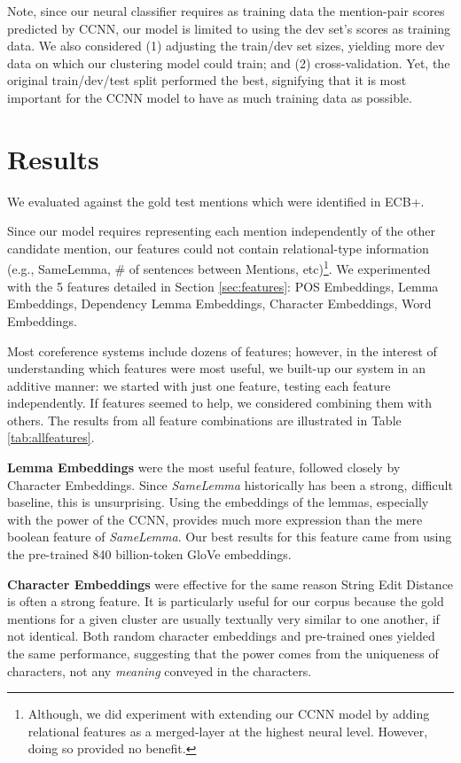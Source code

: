 \documentclass[11pt,a4paper]{article}
\begin{document}
Note, since our neural classifier requires as training data the mention-pair scores predicted by CCNN, our model is limited to using the dev set's scores as training data.  We also considered (1) adjusting the train/dev set sizes, yielding more dev data on which our clustering model could train; and (2) cross-validation.  Yet, the original train/dev/test split performed the best, signifying that it is most important for the CCNN model to have as much training data as possible.

\section{Results}
We evaluated against the gold test mentions which were identified in ECB+.

Since our model requires representing each mention independently of the other candidate mention, our features could not contain relational-type information (e.g., SameLemma, \# of sentences between Mentions, etc)\footnote{Although, we did experiment with extending our CCNN model by adding relational features as a merged-layer at the highest neural level.  However, doing so provided no benefit.}.  We experimented with the 5 features detailed in Section \ref{sec:features}: POS Embeddings, Lemma Embeddings, Dependency Lemma Embeddings, Character Embeddings, Word Embeddings.

Most coreference systems include dozens of features; however, in the interest of understanding which features were most useful, we built-up our system in an additive manner: we started with just one feature, testing each feature independently.  If features seemed to help, we considered combining them with others.  The results from all feature combinations are illustrated in Table \ref{tab:allfeatures}.

\textbf{Lemma Embeddings} were the most useful feature, followed closely by Character Embeddings.  Since \textit{SameLemma} historically has been a strong, difficult baseline, this is unsurprising.  Using the embeddings of the lemmas, especially with the power of the CCNN, provides much more expression than the mere boolean feature of \textit{SameLemma}.  Our best results for this feature came from using the pre-trained 840 billion-token GloVe embeddings.

\textbf{Character Embeddings} were effective for the same reason String Edit Distance is often a strong feature.  It is particularly useful for our corpus because the gold mentions for a given cluster are usually textually very similar to one another, if not identical.  Both random character embeddings and pre-trained ones yielded the same performance, suggesting that the power comes from the uniqueness of characters, not any \textit{meaning} conveyed in the characters.
\end{document}
